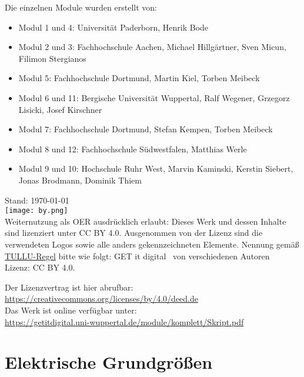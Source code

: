 \documentclass[twoside, a4paper]{article}
\begin{document}
\newpage
\pagestyle{fancyplain}

Die einzelnen Module wurden erstellt von:
\begin{itemize}
	\item Modul 1 und 4: Universität Paderborn, Henrik Bode
	\item Modul 2 und 3: Fachhochschule Aachen, Michael Hillgärtner, Sven Micun, Filimon Stergianos
	\item Modul 5: Fachhochschule Dortmund, Martin Kiel, Torben Meibeck
	\item Modul 6 und 11: Bergische Universität Wuppertal, Ralf Wegener, Grzegorz Lisicki, Josef Kirschner
	\item Modul 7: Fachhochschule Dortmund, Stefan Kempen, Torben Meibeck
	\item Modul 8 und 12: Fachhochschule Südwestfalen, Matthias Werle
	\item Modul 9 und 10: Hochschule Ruhr West, Marvin Kaminski, Kerstin Siebert, Jonas Brodmann, Dominik Thiem
\end{itemize}

\vfill
{\hfill Stand: \today}\\
{\texttt{[image: by.png]}}\\
Weiternutzung als OER ausdrücklich erlaubt: Dieses Werk und dessen Inhalte sind lizenziert unter CC BY 4.0. Ausgenommen von der Lizenz
sind die verwendeten Logos sowie alle anders gekennzeichneten Elemente. Nennung gemäß \href{https://open-educational-resources.de/oer-tullu-regel/}{TULLU-Regel} bitte wie folgt: \glqq GET it digital \grqq\ von verschiedenen Autoren \\ Lizenz: CC BY 4.0.

Der Lizenzvertrag ist hier abrufbar:\\
\url{https://creativecommons.org/licenses/by/4.0/deed.de}\\
Das Werk ist online verfügbar unter:\\
\url{https://getitdigital.uni-wuppertal.de/module/komplett/Skript.pdf}
\newpage

{\setlength{\parskip}{0.05ex}    %
	\tableofcontents
	\newpage
}

\printnomenclature
\cleardoublepage

\pagestyle{fancyplain}
\setheadkapitel

\cleardoublepage
\part{Elektrische Grundgrößen}
\end{document}
